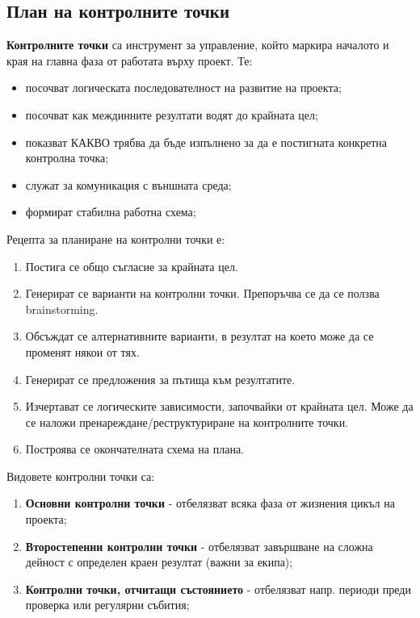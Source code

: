 \documentclass[fleqn,12pt]{article}
\begin{document}
\subsection{План на контролните точки}

\textbf{Контролните точки} са инструмент за управление, който маркира началото и края на главна фаза от работата върху проект.
Те:
\begin{itemize}
    \item посочват логическата последователност на развитие на проекта;
    \item посочват как междинните резултати водят до крайната цел;
    \item показват КАКВО трябва да бъде изпълнено за да е постигната конкретна контролна точка;
    \item служат за комуникация с външната среда;
    \item формират стабилна работна схема;
\end{itemize}

Рецепта за планиране на контролни точки е:
\begin{enumerate}
    \item Постига се общо съгласие за крайната цел.
    \item Генерират се варианти на контролни точки. Препоръчва се да се ползва brainstorming.
    \item Обсъждат се алтернативните варианти, в резултат на което може да се променят някои от тях.
    \item Генерират се предложения за пътища към резултатите.
    \item Изчертават се логическите зависимости, започвайки от крайната цел. Може да се наложи пренареждане/реструктуриране на контролните точки.
    \item Построява се окончателната схема на плана.
\end{enumerate}

Видовете контролни точки са:
\begin{enumerate}
    \item \textbf{Основни контролни точки} - отбелязват всяка фаза от жизнения цикъл на проекта;
    \item \textbf{Второстепенни контролни точки} - отбелязват завършване на сложна дейност с определен краен резултат (важни за екипа);
    \item \textbf{Контролни точки, отчитащи състоянието} - отбелязват напр. периоди преди проверка или регулярни събития;
\end{enumerate}
\end{document}
